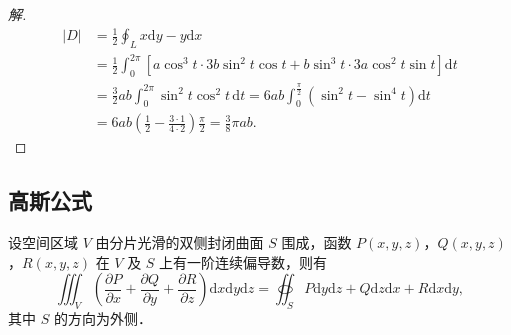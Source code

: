 \begin{proof}[解]
\[
\begin{aligned}
|D|&=\frac{1}{2}\oint_{L}x\mathrm{d}y-y\mathrm{d}x\\
&=\frac{1}{2}\int_{0}^{2\pi}\left[a\cos^{3}t\cdot 3b\sin^{2}t\cos t+b\sin^{3}t\cdot 3a\cos^{2}t\sin t\right]\mathrm{d}t\\
&=\frac{3}{2}ab\int_{0}^{2\pi}\sin^{2}t\cos^{2}t\,\mathrm{d}t=6ab\int_{0}^{\frac{\pi}{2}}\left(\sin^{2}t-\sin^{4}t\right)\mathrm{d}t\\
&=6ab\left(\frac{1}{2}-\frac{3\cdot 1}{4\cdot 2}\right)\frac{\pi}{2}=\frac{3}{8}\pi ab.
\end{aligned}
\]
\end{proof}

\subsection{高斯公式}

\begin{theorem}[高斯公式]\label{thm:22-2}
设空间区域 $V$ 由分片光滑的双侧封闭曲面 $S$ 围成，函数 $P(x,y,z)$，$Q(x,y,z)$，$R(x,y,z)$ 在 $V$ 及 $S$ 上有一阶连续偏导数，则有
\[
\iiint_{V}\left(\frac{\partial P}{\partial x}+\frac{\partial Q}{\partial y}+\frac{\partial R}{\partial z}\right)\mathrm{d}x\mathrm{d}y\mathrm{d}z=\oiint_{S}P\mathrm{d}y\mathrm{d}z+Q\mathrm{d}z\mathrm{d}x+R\mathrm{d}x\mathrm{d}y,
\]
其中 $S$ 的方向为外侧．
\end{theorem}


